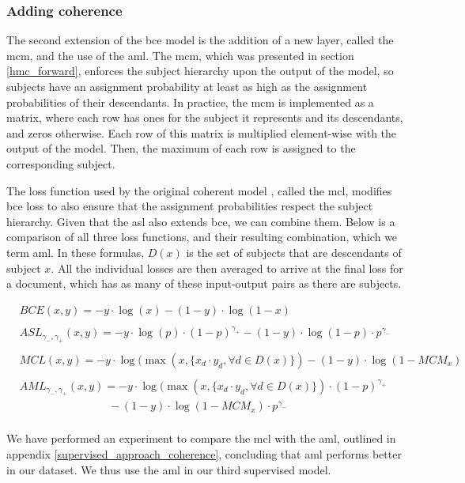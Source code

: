 \subsubsection{Adding coherence} \label{supervised_approach_add_coherence}

The second extension of the \acrshort{bce} model is the addition of a new layer, called the \acrfull{mcm}, and the use of the \acrfull{aml}. The \acrshort{mcm}, which was presented in section \ref{hmc_forward}, enforces the subject hierarchy upon the output of the model, so subjects have an assignment probability at least as high as the assignment probabilities of their descendants. In practice, the \acrshort{mcm} is implemented as a matrix, where each row has ones for the subject it represents and its descendants, and zeros otherwise. Each row of this matrix is multiplied element-wise with the output of the model. Then, the maximum of each row is assigned to the corresponding subject.

The loss function used by the original coherent model \cite{giunchiglia2020coherent}, called the \acrfull{mcl}, modifies \acrshort{bce} loss to also ensure that the assignment probabilities respect the subject hierarchy. Given that the \acrshort{asl} also extends  \acrshort{bce}, we can combine them. Below is a comparison of all three loss functions, and their resulting combination, which we term \acrfull{aml}. In these formulas, $D(x)$ is the set of subjects that are descendants of subject $x$. All the individual losses are then averaged to arrive at the final loss for a document, which has as many of these input-output pairs as there are subjects.

\begin{align*}
    & BCE(x, y) = -y \cdot \log (x) - (1-y) \cdot \log (1-x) \\ \\
    & ASL_{\gamma_-, \gamma_+}(x, y) = -y \cdot \log (p) \cdot (1-p)^{\gamma_+} - (1-y) \cdot \log (1-p) \cdot p^{\gamma_-} \\ \\
    & MCL(x, y) = -y \cdot \log (\max(x, \{x_d \cdot y_d, \forall d \in D(x)\}) - (1 - y) \cdot \log (1 - MCM_x) \\ \\
    & AML_{\gamma_-, \gamma_+}(x, y) = -y \cdot \log (\max(x, \{x_d \cdot y_d, \forall d \in D(x)\}) \cdot (1-p)^{\gamma_+} \\
    & \qquad \qquad \qquad \qquad - (1 - y) \cdot \log (1 - MCM_x) \cdot p^{\gamma_-} \\
\end{align*}

We have performed an experiment to compare the \acrshort{mcl} with the \acrshort{aml}, outlined in appendix \ref{supervised_approach_coherence}, concluding that \acrshort{aml} performs better in our dataset. We thus use the \acrshort{aml} in our third supervised model.